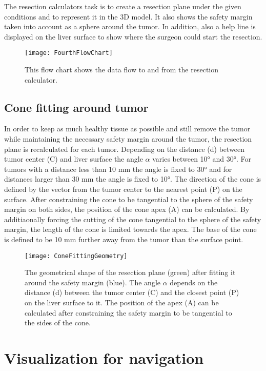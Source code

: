 The resection calculators task is to create a resection plane under the given
conditions and to represent it in the 3D model. It also shows the safety margin taken
into account as a sphere around the tumor. In addition, also a help line is displayed
on the liver surface to show where the surgeon could start the resection.
\begin{figure}[H]
  \centering
 \texttt{[image: FourthFlowChart]}
  \caption{This flow chart shows the data flow to and from the resection calculator.}
  \label{fig:FourthFlowChart}
\end{figure}

\subsection{Cone fitting around tumor}
In order to keep as much healthy tissue as possible and still remove the tumor
while maintaining the necessary safety margin around the tumor, the resection
plane is recalculated for each tumor. Depending on the distance (d) between tumor
center (C) and liver surface the angle $\alpha$ varies between 10° and 30°. For
tumors with a distance less than 10 mm the angle is fixed to 30° and for
distances larger than 30 mm the angle is fixed to 10°. The direction of the cone
is defined by the vector from the tumor center to the nearest point (P) on the
surface. After constraining the cone to be tangential to the sphere of the
safety margin on both sides, the position of the cone apex (A) can be calculated. By
additiaonally forcing the cutting of the cone tangential to the sphere of the
safety margin, the length of the cone is limited towards the apex. The base of
the cone is defined to be 10 mm further away from the tumor than the surface
point. 

\begin{figure}[H]
  \centering
 \texttt{[image: ConeFittingGeometry]}
  \caption{The geometrical shape of the resection plane (green) after fitting it
  around the safety margin (blue). The angle $\alpha$ depends on the distance (d)
  between the tumor center (C) and the closest point (P) on the liver surface to
  it. The position of the apex (A) can be calculated after constraining the
  safety margin to be tangential to the sides of the cone.}
  \label{fig:ConeFittingGeometry}
\end{figure}

\section{Visualization for navigation}
